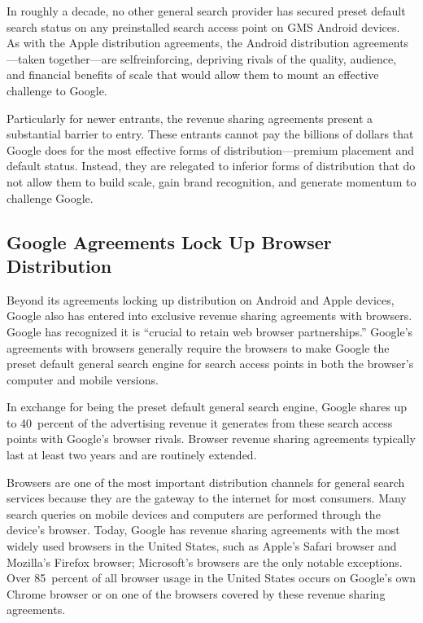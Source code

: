 \documentclass[11pt,b5paper,headings=small]{scrartcl}
\begin{document}
\begin{enumerate}

In roughly a decade, no other general search provider has secured preset default
search status on any preinstalled search access point on GMS Android devices. As with the
Apple distribution agreements, the Android distribution agreements—taken together—are selfreinforcing, depriving rivals of the quality, audience, and financial benefits of scale that would
allow them to mount an effective challenge to Google.


Particularly for newer entrants, the revenue sharing agreements present a
substantial barrier to entry. These entrants cannot pay the billions of dollars that Google does for
the most effective forms of distribution—premium placement and default status. Instead, they are
relegated to inferior forms of distribution that do not allow them to build scale, gain brand
recognition, and generate momentum to challenge Google.
\end{enumerate}
\subsection{Google Agreements Lock Up Browser Distribution}


Beyond its agreements locking up distribution on Android and Apple devices,
Google also has entered into exclusive revenue sharing agreements with browsers. Google has
recognized it is “crucial to retain web browser partnerships.” Google’s agreements with browsers
generally require the browsers to make Google the preset default general search engine for
search access points in both the browser’s computer and mobile versions.


In exchange for being the preset default general search engine, Google shares up
to 40~percent of the advertising revenue it generates from these search access points with
Google’s browser rivals. Browser revenue sharing agreements typically last at least two years
and are routinely extended.


Browsers are one of the most important distribution channels for general search
services because they are the gateway to the internet for most consumers. Many search queries
on mobile devices and computers are performed through the device’s browser. Today, Google
has revenue sharing agreements with the most widely used browsers in the United States, such as
Apple’s Safari browser and Mozilla’s Firefox browser; Microsoft’s browsers are the only notable
exceptions. Over 85~percent of all browser usage in the United States occurs on Google’s own
Chrome browser or on one of the browsers covered by these revenue sharing agreements.
\end{document}
